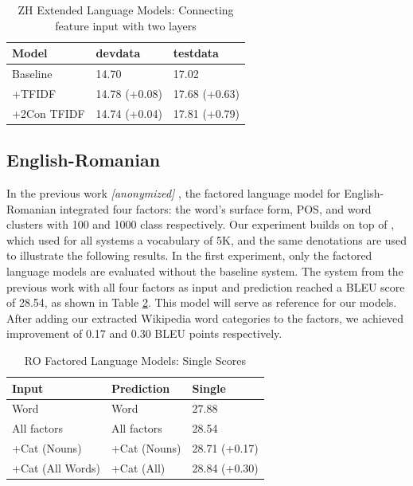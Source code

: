 \documentclass[a4paper]{article}
\newcommand{\anony}[1]{\textit{[anonymized]}}
\begin{document}
\begin{table}
\caption{ZH Extended Language Models: Connecting feature input with two layers}
\centering
  \begin{tabular}{lll}
  	\hline
  	Model       & devdata       & testdata      \\ \hline\hline
  	Baseline    & 14.70         & 17.02         \\ \hline
  	+TFIDF      & 14.78 (+0.08) & 17.68 (+0.63) \\
  	+2Con TFIDF & 14.74 (+0.04) & 17.81 (+0.79)
  \end{tabular}
  \label{tb:zh-extended-both}
\end{table}


\subsection{English-Romanian}
In the previous work \anony{\cite{niehuesusing}} , the factored language model for English-Romanian integrated four factors: the word's surface form, POS, and word clusters with 100 and 1000 class respectively. Our experiment builds on top of \cite{niehuesusing}, which used for all systems a vocabulary of 5K, and the same denotations are used to illustrate the following results. In the first experiment, only the factored language models are evaluated without the baseline system. The system from the previous work with all four factors as input and prediction reached a BLEU score of 28.54, as shown in Table \ref{tb:ro-factored-single}. This model will serve as reference for our models. After adding our extracted Wikipedia word categories to the factors, we achieved improvement of 0.17 and 0.30 BLEU points respectively.


\begin{table}
\caption{RO Factored Language Models: Single Scores}
\centering
  \begin{tabular}{lll}
  	\hline
  	Input            & Prediction   & Single        \\ \hline\hline
  	Word             & Word         & 27.88         \\
  	All factors      & All factors  & 28.54         \\ \hline
  	+Cat (Nouns)     & +Cat (Nouns) & 28.71 (+0.17) \\
  	+Cat (All Words) & +Cat (All)   & 28.84 (+0.30)
  \end{tabular}
  \label{tb:ro-factored-single}
\end{table}
\end{document}
